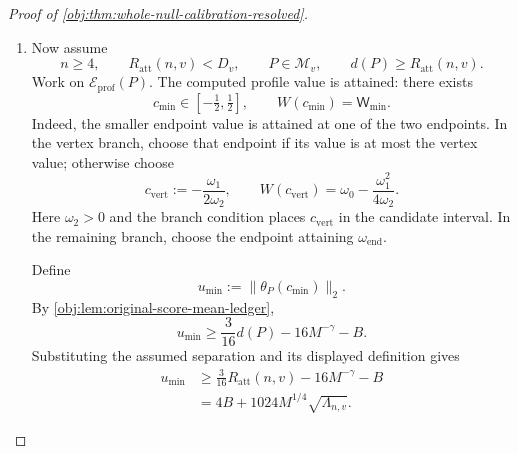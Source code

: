 \begin{proof}[Proof of \cref{obj:thm:whole-null-calibration-resolved}]
\begin{enumerate}
Combining these bounds with the preceding step, on \(\mathcal E_{\mathrm{prof}}(P)\),
\[
\mathsf W_{\min}
\le W(c_0)
\le2B^2+65536\sqrt M\,\Lambda_{n,v}
\le h_{n,v}.
\]
The strict rejection rule in \cref{obj:def:explicit-score-ledger} consequently gives
\[
\psi_{n,v}(\text{sample},\text{seed})=0
\quad\text{on }\mathcal E_{\mathrm{prof}}(P)\times[0,1].
\]

Define the experiment measure and its good event by
\[
\mathbb P_{\mathrm{exp}}:=P^{\otimes n}\otimes\lambda,
\qquad
\mathcal E_{\mathrm{exp}}(P)
:=\mathcal E_{\mathrm{prof}}(P)\times[0,1].
\]
Independence and the unit mass of \(\lambda\) imply
\[
\mathbb P_{\mathrm{exp}}\!\left(\mathcal E_{\mathrm{exp}}(P)\right)
=
P^{\otimes n}\!\left(\mathcal E_{\mathrm{prof}}(P)\right).
\]
The test takes values in \([0,1]\), so pointwise
\[
0\le\psi_{n,v}
\le\mathbf1_{\mathcal E_{\mathrm{exp}}(P)^c}.
\]
Integrating this inequality gives
\[
\begin{aligned}
\mathsf R_n(P,\psi_{n,v})
&\le
\mathbb P_{\mathrm{exp}}\!\left(\mathcal E_{\mathrm{exp}}(P)^c\right)\\
&=1-P^{\otimes n}\!\left(\mathcal E_{\mathrm{prof}}(P)\right)\\
&\le0.0075.
\end{aligned}
\]
For \(n<4\), the zero-test branch gives directly
\[
\mathsf R_n(P,\psi_{n,v})=0\le0.0075.
\]

\item Now assume
\[
n\ge4,
\qquad
R_{\mathrm{att}}(n,v)<D_v,
\qquad
P\in\mathcal M_v,
\qquad
d(P)\ge R_{\mathrm{att}}(n,v).
\]
Work on \(\mathcal E_{\mathrm{prof}}(P)\). The computed profile value is attained: there exists
\[
c_{\min}\in[-\tfrac12,\tfrac12],
\qquad
W(c_{\min})=\mathsf W_{\min}.
\]
Indeed, the smaller endpoint value is attained at one of the two endpoints. In the vertex branch, choose that endpoint if its value is at most the vertex value; otherwise choose
\[
c_{\mathrm{vert}}:=-\frac{\omega_1}{2\omega_2},
\qquad
W(c_{\mathrm{vert}})
=\omega_0-\frac{\omega_1^2}{4\omega_2}.
\]
Here \(\omega_2>0\) and the branch condition places \(c_{\mathrm{vert}}\) in the candidate interval. In the remaining branch, choose the endpoint attaining \(\omega_{\mathrm{end}}\).

Define
\[
u_{\min}:=\|\theta_P(c_{\min})\|_2.
\]
By \cref{obj:lem:original-score-mean-ledger},
\[
u_{\min}
\ge\frac{3}{16}d(P)-16M^{-\gamma}-B.
\]
Substituting the assumed separation and its displayed definition gives
\[
\begin{aligned}
u_{\min}
&\ge
\frac{3}{16}R_{\mathrm{att}}(n,v)-16M^{-\gamma}-B\\
&=4B+1024M^{1/4}\sqrt{\Lambda_{n,v}}.
\end{aligned}
\]


\end{enumerate}
\end{proof}
